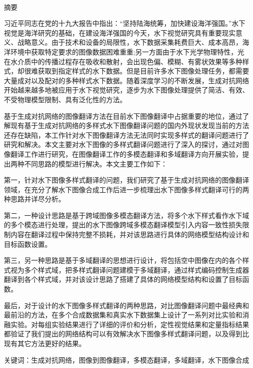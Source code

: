 \newpage

\pagestyle{plain}
\clearpage{}

\begin{center}
  {\sanhao[1.5]\heiti\oucctitle\\\vskip7pt 摘\hspace{1em}要}
\end{center}
{\normalsize\songti

习近平同志在党的十九大报告中指出：“坚持陆海统筹，加快建设海洋强国。”水下视觉是海洋研究的基础，在建设海洋强国的今天，水下视觉研究具有重要现实意义、战略意义。由于技术和设备的局限性，水下数据采集耗费巨大、成本高昂，海洋环境中获取特定要求的图像数据困难重重;另一方面由于水下光学物理特性，光在水介质中的传播过程存在吸收和散射，会出现色偏、模糊、有雾状效果等多种样式，却很难获取到指定样式的水下数据。但是目前许多水下图像处理任务，都需要大量成对以及配对的多种样式水下数据。随着深度学习的不断发展，生成对抗网络开始越来越多地被应用于水下视觉研究，逐步为水下图像处理提供了简洁、有效、不受物理模型限制、具有泛化性的方法。

基于生成对抗网络的图像翻译方法在目前水下图像翻译中占据重要的地位，通过了解现有基于生成对抗网络的多样式水下图像翻译问题的国内外现状发现当前的方法还存在缺陷，本工作针对水下图像翻译方法无法同时实现多样式的翻译问题进行了研究和解决。本文主要对水下图像的多样式翻译问题进行了深入的探讨，通过对图像翻译工作进行研究，在图像翻译工作的多模态翻译和多域翻译方向开展实验，提出两种不同思路的模型进行解决。本文主要工作如下：

第一，针对水下图像多样式翻译的问题，我们研究了基于生成对抗网络的图像翻译领域，在充分了解水下图像合成工作后进一步梳理出水下图像多样式翻译可行的两种思路并详尽分析。

第二，一种设计思路是基于跨域图像多模态翻译方法，将多个水下样式看作水下域的多个模态进行处理，提出的水下图像跨域多模态翻译模型引入内容一致性损失限制内容在翻译过程中保持完整不损耗，并对该思路进行具体的网络模型结构设计和目标函数设置。

第三，另一种思路是基于多域翻译的思想进行设计，将包括空中图像在内的各个样式视为多个样式域，把多样式翻译问题建模于多域翻译，通过样式编码控制生成器翻译到各个样式域，并对该设计思路了搭建了具体的网络模型结构和设置了目标函数。

最后，对于设计的水下图像多样式翻译的两种思路，对比图像翻译问题中最经典和最前沿的方法，在多个合成数据集和真实水下数据集上设计了一系列对比实验和消融实验。对每组实验结果进行了详细的评价和分析，定性视觉结果和定量指标结果都验证了我们提出的网络结构可以有效解决水下图像多样式翻译问题，以及得到比现有其它方法更好的结果。
}
\vskip12bp
{\xiaosi\heiti\noindent
关键词：生成对抗网络，图像到图像翻译，多模态翻译，多域翻译，水下图像合成}

